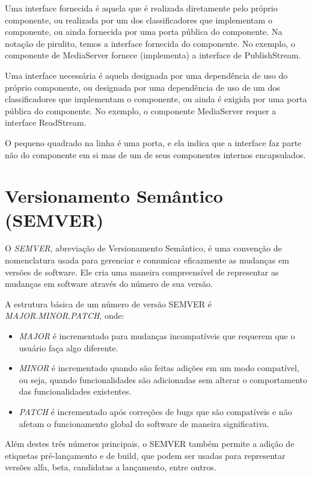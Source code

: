 \documentclass[12pt, %
openright, 
oneside, %
a4paper,    %
brazil]{facom-ufu-abntex2}
\begin{document}
Uma interface fornecida é aquela que é realizada diretamente pelo próprio
componente, ou realizada por um dos classificadores que implementam o
componente, ou ainda fornecida por uma porta pública do componente. Na notação
de pirulito, temos a interface fornecida do componente. No exemplo, o
componente de MediaServer fornece (implementa) a interface de PublishStream.

Uma interface necessária é aquela designada por uma dependência de uso do
próprio componente, ou designada por uma dependência de uso de um dos
classificadores que implementam o componente, ou ainda é exigida por uma porta
pública do componente. No exemplo, o componente MediaServer requer a interface
ReadStream.

O pequeno quadrado na linha é uma porta, e ela indica que a interface faz parte
não do componente em si mas de um de seus componentes internos encapsulados.

\section{Versionamento Semântico (SEMVER)}

O \textit{SEMVER}, abreviação de Versionamento Semântico, é uma convenção de
nomenclatura usada para gerenciar e comunicar eficazmente as mudanças em
versões de software. Ele cria uma maneira compreensível de representar as
mudanças em software através do número de sua versão.

A estrutura básica de um número de versão SEMVER é \textit{MAJOR.MINOR.PATCH},
onde:

\begin{itemize}
	\item \textit{MAJOR} é incrementado para mudanças incompatíveis que
	      requerem que o usuário faça algo diferente.
	\item \textit{MINOR} é incrementado quando são feitas adições em um
	      modo compatível, ou seja, quando funcionalidades são adicionadas
	      sem alterar o comportamento das funcionalidades existentes.
	\item \textit{PATCH} é incrementado após correções de bugs que são
	      compatíveis e não afetam o funcionamento global do software de
	      maneira significativa.
\end{itemize}

Além destes três números principais, o SEMVER também permite a adição de
etiquetas pré-lançamento e de build, que podem ser usadas para representar
versões alfa, beta, candidatas a lançamento, entre outros.
\end{document}
